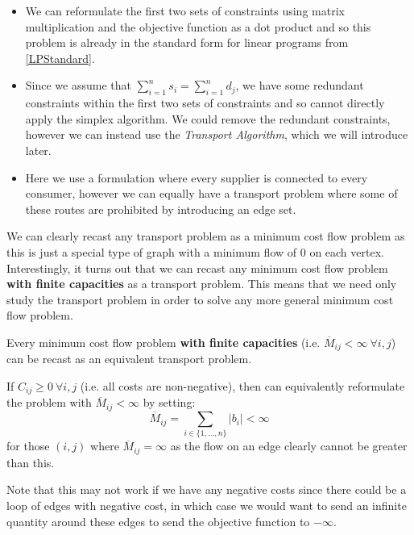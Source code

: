 \documentclass[../main.tex]{subfiles}
\begin{document}
\begin{remark}[Remarks]
  \begin{itemize}
    \item We can reformulate the first two sets of constraints using matrix multiplication and the objective function as a dot product and so this problem is already in the standard form for linear programs from \cref{LPStandard}.
    \item Since we assume that $\sum_{i = 1}^{n} s_i = \sum_{i = 1}^{n} d_j$, we have some redundant constraints within the first two sets of constraints and so cannot directly apply the simplex algorithm.
      We could remove the redundant constraints, however we can instead use the \textit{Transport Algorithm}, which we will introduce later.
    \item Here we use a formulation where every supplier is connected to every consumer, however we can equally have a transport problem where some of these routes are prohibited by introducing an edge set.
  \end{itemize}
\end{remark}
We can clearly recast any transport problem as a minimum cost flow problem as this is just a special type of graph with a minimum flow of 0 on each vertex.
Interestingly, it turns out that we can recast any minimum cost flow problem \textbf{with finite capacities} as a transport problem.
This means that we need only study the transport problem in order to solve any more general minimum cost flow problem.
\begin{theorem}
  Every minimum cost flow problem \textbf{with finite capacities} (i.e. $\overline{M}_{i j} < \infty\ \forall i, j$) can be recast as an equivalent transport problem.
\end{theorem}
\begin{remark}
  If $C_{i j} \geq 0\ \forall i, j$ (i.e. all costs are non-negative), then can equivalently reformulate the problem with $\overline{M}_{i j} < \infty$ by setting:
  \[
    \overline{M}_{i j} = \sum_{i \in \{1, \ldots, n\}} |b_i| < \infty
  \]
  for those $(i, j)$ where $\overline{M}_{i j} = \infty$ as the flow on an edge clearly cannot be greater than this.

  Note that this may not work if we have any negative costs since there could be a loop of edges with negative cost, in which case we would want to send an infinite quantity around these edges to send the objective function to $-\infty$.
\end{remark}
\end{document}
